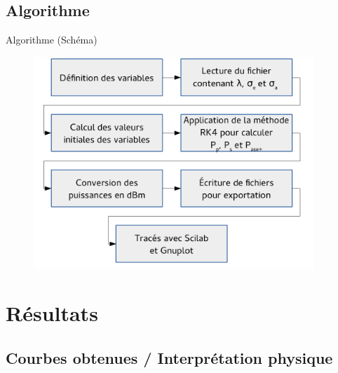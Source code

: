 \documentclass{beamer}
\begin{document}
\subsection{Algorithme}


\begin{frame}{Algorithme (Schéma)}

\begin{figure}
    \centering
    \includegraphics[width=\textwidth,height=8cm]{algo.pdf}
\end{figure}

\end{frame}

\section{Résultats}

\subsection{Courbes obtenues / Interprétation physique}
\end{document}
